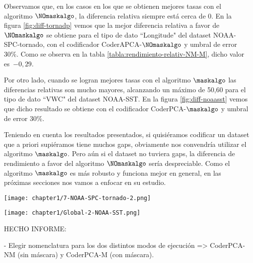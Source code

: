 Observamos que, en los casos en los que se obtienen mejores tasas con el algoritmo $\NOmaskalgo$, la diferencia relativa siempre está cerca de 0. En la figura \ref{fig:diff-tornadp} vemos que la mejor diferencia relativa a favor de $\NOmaskalgo$ se obtiene para el tipo de dato ``Longitude" del dataset NOAA-SPC-tornado, con el codificador CoderAPCA-$\NOmaskalgo$ y umbral de error 30\%. Como se observa en la tabla \ref{tabla:rendimiento-relativ-NM-M}, dicho valor es~$-0,29$.

Por otro lado, cuando se logran mejores tasas con el algoritmo $\maskalgo$ las diferencias relativas son mucho mayores, alcanzando un máximo de 50,60 para el tipo de dato ``VWC" del dataset NOAA-SST. En la figura \ref{fig:diff-noaasst} vemos que dicho resultado se obtiene con el codificador CoderPCA-$\maskalgo$ y umbral de error 30\%.

Teniendo en cuenta los resultados presentados, si quisiéramos codificar un dataset que a priori supiéramos tiene muchos gaps, obviamente nos convendría utilizar el algoritmo $\maskalgo$. Pero aún si el dataset no tuviera gaps, la diferencia de rendimiento a favor del algoritmo $\NOmaskalgo$ sería despreciable. Como el algoritmo $\maskalgo$ es más robusto y funciona mejor en general, en las próximas secciones nos vamos a enfocar en su estudio.




\begin{sidewaysfigure}
  \centering
    \texttt{[image: chapter1/7-NOAA-SPC-tornado-2.png]}
    \caption{Tasa de compresión y Diferencia relativa para las distintas combinaciones\\ <codificador, umbral> para el tipo de dato ``Longitude" del dataset NOAA-SPC-tornado.}
  \label{fig:diff-tornadp}
  \vspace{20pt}
    \texttt{[image: chapter1/Global-2-NOAA-SST.png]}
    \caption{Tasa de compresión y Diferencia relativa para las distintas combinaciones\\ <codificador, umbral> para el tipo de dato ``VWC" del dataset NOAA-SST.}
  \label{fig:diff-noaasst}
  \vspace{+25pt}
\end{sidewaysfigure}



\clearpage

HECHO INFORME:

- Elegir nomenclatura para los dos distintos modos de ejecución => CoderPCA-NM (sin máscara) y CoderPCA-M (con máscara).

